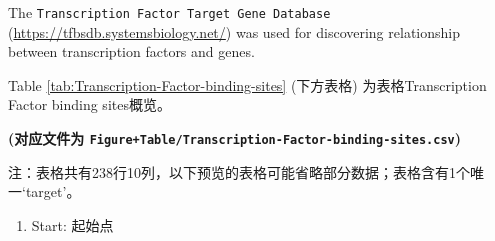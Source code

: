 \documentclass[
]{article}
\providecommand{\tightlist}{%
  \setlength{\itemsep}{0pt}\setlength{\parskip}{0pt}}
\begin{document}
The \texttt{Transcription\ Factor\ Target\ Gene\ Database} (\url{https://tfbsdb.systemsbiology.net/}) was used for discovering relationship between transcription factors and genes.

Table \ref{tab:Transcription-Factor-binding-sites} (下方表格) 为表格Transcription Factor binding sites概览。

\textbf{(对应文件为 \texttt{Figure+Table/Transcription-Factor-binding-sites.csv})}

\begin{center}\begin{tcolorbox}[colback=gray!10, colframe=gray!50, width=0.9\linewidth, arc=1mm, boxrule=0.5pt]注：表格共有238行10列，以下预览的表格可能省略部分数据；表格含有1个唯一`target'。
\end{tcolorbox}
\end{center}
\begin{center}\begin{tcolorbox}[colback=gray!10, colframe=gray!50, width=0.9\linewidth, arc=1mm, boxrule=0.5pt]\begin{enumerate}\tightlist
\item Start:  起始点
\end{enumerate}\end{tcolorbox}
\end{center}
\end{document}
